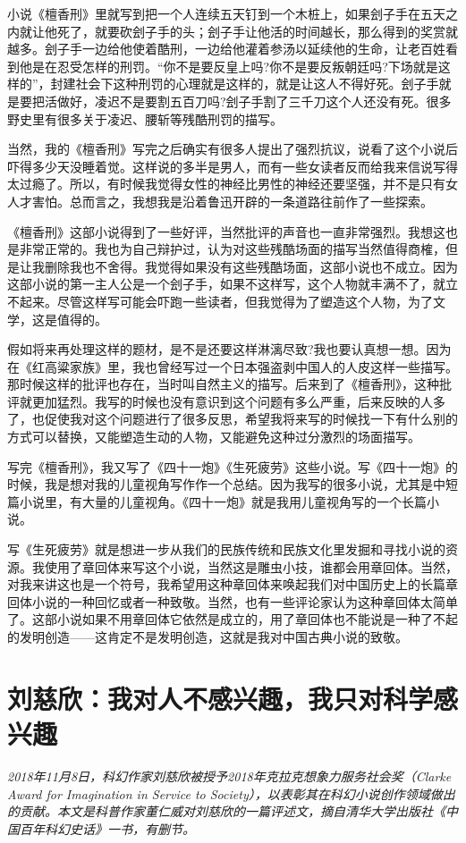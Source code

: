 \documentclass[fontset=fandol,12pt,a5paper]{ctexbook}
\begin{document}
小说《檀香刑》里就写到把一个人连续五天钉到一个木桩上，如果刽子手在五天之内就让他死了，就要砍刽子手的头；刽子手让他活的时间越长，那么得到的奖赏就越多。刽子手一边给他使着酷刑，一边给他灌着参汤以延续他的生命，让老百姓看到他是在忍受怎样的刑罚。“你不是要反皇上吗?你不是要反叛朝廷吗?下场就是这样的”，封建社会下这种刑罚的心理就是这样的，就是让这人不得好死。刽子手就是要把活做好，凌迟不是要割五百刀吗?刽子手割了三千刀这个人还没有死。很多野史里有很多关于凌迟、腰斩等残酷刑罚的描写。

当然，我的《檀香刑》写完之后确实有很多人提出了强烈抗议，说看了这个小说后吓得多少天没睡着觉。这样说的多半是男人，而有一些女读者反而给我来信说写得太过瘾了。所以，有时候我觉得女性的神经比男性的神经还要坚强，并不是只有女人才害怕。总而言之，我想我是沿着鲁迅开辟的一条道路往前作了一些探索。

《檀香刑》这部小说得到了一些好评，当然批评的声音也一直非常强烈。我想这也是非常正常的。我也为自己辩护过，认为对这些残酷场面的描写当然值得商榷，但是让我删除我也不舍得。我觉得如果没有这些残酷场面，这部小说也不成立。因为这部小说的第一主人公是一个刽子手，如果不这样写，这个人物就丰满不了，就立不起来。尽管这样写可能会吓跑一些读者，但我觉得为了塑造这个人物，为了文学，这是值得的。

假如将来再处理这样的题材，是不是还要这样淋漓尽致?我也要认真想一想。因为在《红高粱家族》里，我也曾经写过一个日本强盗剥中国人的人皮这样一些描写。那时候这样的批评也存在，当时叫自然主义的描写。后来到了《檀香刑》，这种批评就更加猛烈。我写的时候也没有意识到这个问题有多么严重，后来反映的人多了，也促使我对这个问题进行了很多反思，希望我将来写的时候找一下有什么别的方式可以替换，又能塑造生动的人物，又能避免这种过分激烈的场面描写。

写完《檀香刑》，我又写了《四十一炮》《生死疲劳》这些小说。写《四十一炮》的时候，我是想对我的儿童视角写作作一个总结。因为我写的很多小说，尤其是中短篇小说里，有大量的儿童视角。《四十一炮》就是我用儿童视角写的一个长篇小说。

写《生死疲劳》就是想进一步从我们的民族传统和民族文化里发掘和寻找小说的资源。我使用了章回体来写这个小说，当然这是雕虫小技，谁都会用章回体。当然，对我来讲这也是一个符号，我希望用这种章回体来唤起我们对中国历史上的长篇章回体小说的一种回忆或者一种致敬。当然，也有一些评论家认为这种章回体太简单了。这部小说如果不用章回体它依然是成立的，用了章回体也不能说是一种了不起的发明创造——这肯定不是发明创造，这就是我对中国古典小说的致敬。

\newpage

\section{刘慈欣：我对人不感兴趣，我只对科学感兴趣}
\emph{2018年11月8日，科幻作家刘慈欣被授予2018年克拉克想象力服务社会奖（Clarke Award for Imagination in Service to Society），以表彰其在科幻小说创作领域做出的贡献。本文是科普作家董仁威对刘慈欣的一篇评述文，摘自清华大学出版社《中国百年科幻史话》一书，有删节。}
\vspace{2em}
\end{document}
